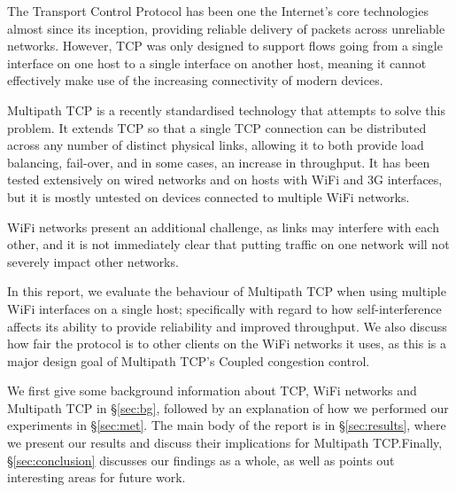 The Transport Control Protocol has been one the Internet's core technologies almost
since its inception, providing reliable delivery of packets across unreliable
networks. However, TCP was only designed to support flows going from a single
interface on one host to a single interface on another host, meaning it cannot
effectively make use of the increasing connectivity of modern devices.

Multipath TCP is a recently standardised technology that attempts to solve this
problem. It extends TCP so that a single TCP connection can be distributed
across any number of distinct physical links, allowing it to both provide load
balancing, fail-over, and in some cases, an increase in throughput. It has been
tested extensively on wired networks and on hosts with WiFi and 3G interfaces,
but it is mostly untested on devices connected to multiple WiFi networks.

WiFi networks present an additional challenge, as links may interfere with each
other, and it is not immediately clear that putting traffic on one network will
not severely impact other networks.

In this report, we evaluate the behaviour of Multipath TCP when using multiple
WiFi interfaces on a single host; specifically with regard to how
self-interference affects its ability to provide reliability and improved
throughput. We also discuss how fair the protocol is to other clients on the WiFi
networks it uses, as this is a major design goal of Multipath TCP's Coupled
congestion control.

We first give some background information about TCP, WiFi networks and Multipath
TCP in \S\ref{sec:bg}, followed by an explanation of how we performed our
experiments in \S\ref{sec:met}. The main body of the report is in
\S\ref{sec:results}, where we present our results and discuss their implications
for Multipath TCP.\@ Finally, \S\ref{sec:conclusion} discusses our findings as a
whole, as well as points out interesting areas for future work.

